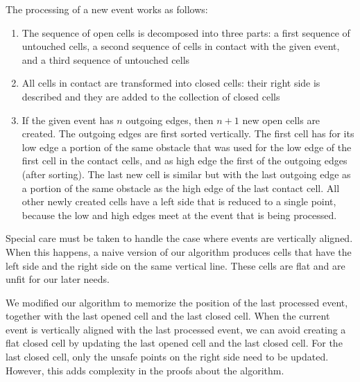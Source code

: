 \documentclass{easychair}
\begin{document}
The processing of a new event works as follows:
\begin{enumerate}
\item The sequence of open cells is decomposed into three parts:
a first sequence of untouched cells, a second sequence of cells in
contact with the given event, and a third sequence of
untouched cells
\item All cells in contact are transformed into closed cells:
their right side is
  described and they are added to the collection of closed cells
\item If the given event has \(n\) outgoing edges, then \(n+1\) new
  open cells are created.  The outgoing edges are first sorted vertically.
  The first cell has for its low edge a portion of the same obstacle that
  was used for the low edge of the first cell in the contact cells, and
  as high edge the first of the outgoing edges (after sorting).  The
  last new cell is similar but with the last outgoing edge as a portion
  of the same obstacle as the high edge of the last contact cell.
  All other newly created cells have a
  left side that is reduced to a single point, because the low and
  high edges meet at the event that is being processed.
\end{enumerate}

Special care must be taken to handle the case where events are
vertically aligned.  When this happens, a naive version of our
algorithm produces cells that have the left side and the right side on the
same vertical line.  These cells are flat and are unfit for our later needs.

We modified our algorithm to memorize the
position of the last processed event, together with the last opened
cell and the last closed cell.  When the current event is vertically
aligned with the last processed event, we can avoid creating a flat
closed cell by updating the last opened cell and the last closed
cell.  For the last closed cell, only the unsafe points on the right side
need to be updated.  However, this adds complexity in the proofs about the
algorithm.
\end{document}
